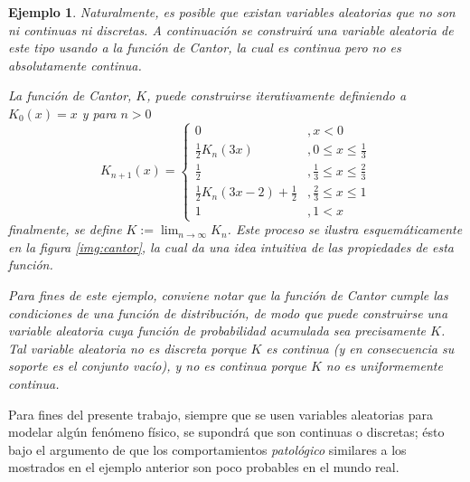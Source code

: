 \documentclass[12pt,letterpaper]{book}
\newtheorem{ejemplo}{Ejemplo}[chapter]
\begin{document}
\begin{ejemplo}
Naturalmente, es posible que existan variables aleatorias que no son ni continuas ni discretas.
%
A continuación se construirá una variable aleatoria de este tipo usando a la función de Cantor, la cual es continua pero no es absolutamente continua.

La función de Cantor, $K$, puede construirse iterativamente definiendo a $K_0(x) = x$ y para $n>0$
\begin{equation}
K_{n+1}(x) =
\begin{cases}
0 &, x < 0 \\
\frac{1}{2} K_n(3 x) &, 0\leq x \leq \frac{1}{3} \\
\frac{1}{2} &, \frac{1}{3} \leq x \leq \frac{2}{3} \\
\frac{1}{2} K_n(3 x-2) + \frac{1}{2} &, \frac{2}{3}\leq x \leq 1 \\
1 &, 1 < x
\end{cases}
\end{equation}
finalmente, se define $K := \lim_{n\rightarrow \infty} K_n$. Este proceso se ilustra esquemáticamente en la figura \ref{img:cantor}, la cual da una idea intuitiva de las propiedades de esta función.

Para fines de este ejemplo, conviene notar que la función de Cantor cumple las condiciones de una función de distribución, de modo que puede construirse una variable aleatoria cuya función de probabilidad acumulada sea precisamente $K$.
%
Tal variable aleatoria no es discreta porque $K$ es continua (y en consecuencia su soporte es el conjunto vacío), y no es continua porque $K$ no es uniformemente continua.
\end{ejemplo}

Para fines del presente trabajo, siempre que se usen variables aleatorias para modelar algún fenómeno físico, se supondrá que son continuas o discretas; ésto bajo el argumento de que los comportamientos \textit{patológico} similares a los mostrados en el ejemplo anterior son poco probables en el mundo real.
\end{document}
